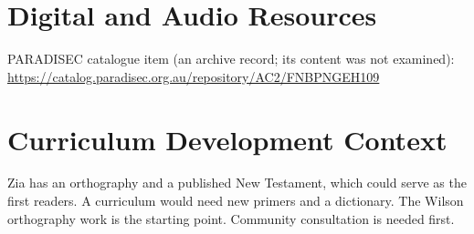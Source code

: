 \documentclass[12pt]{article}
\begin{document}
\section{Digital and Audio Resources}
PARADISEC catalogue item (an archive record; its content was not examined): \url{https://catalog.paradisec.org.au/repository/AC2/FNBPNGEH109}

\section{Curriculum Development Context}
Zia has an orthography and a published New Testament, which could serve as the first readers. A curriculum would need new primers and a dictionary. The Wilson orthography work is the starting point. Community consultation is needed first.
\end{document}
